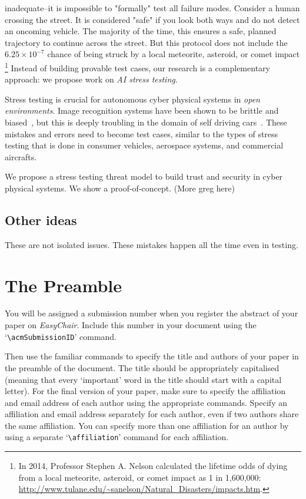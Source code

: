 \documentclass[sigconf,anonymous]{aamas}
\begin{document}
inadequate--it is impossible to "formally" test all failure modes.
Consider a human crossing the street.  It is considered "safe" if you
look both ways and do not detect an oncoming vehicle.  The majority of
the time, this ensures a safe, planned trajectory to continue across
the street.  But this protocol does not include the \(6.25 \times
10^{-7}\) chance of being struck by a local meteorite, asteroid, or
comet impact \footnote{In 2014, Professor Stephen A. Nelson calculated the lifetime
odds of dying from a local meteorite, asteroid, or comet impact as 1
in 1,600,000:
\url{http://www.tulane.edu/\~sanelson/Natural\_Disasters/impacts.htm}.} Instead of building provable test cases, our
research is a complementary approach: we propose work on \emph{AI stress
testing}.

Stress testing is crucial for autonomous cyber physical systems in
\emph{open environments}.  Image recognition systems have been shown to be
brittle and biased~\cite{fooled}, but this is deeply troubling in the
domain of self driving cars~\cite{physical-attacks}.  These mistakes and errors
need to become test cases, similar to the types of stress testing that
is done in consumer vehicles, aerospace systems, and commercial
aircrafts.  

We propose a stress testing threat model to build trust and security
in cyber physical systems.  We show a proof-of-concept. (More greg here)

\subsection{Other ideas}
\label{sec:org4ff9cc9}
These are not isolated issues.  These mistakes happen all the time
even in testing.


\section{The Preamble}

You will be assigned a submission number when you register the abstract 
of your paper on \textit{EasyChair}. Include this number in your 
document using the `\verb|\acmSubmissionID|' command.

Then use the familiar commands to specify the title and authors of your
paper in the preamble of the document. The title should be appropriately 
capitalised (meaning that every `important' word in the title should 
start with a capital letter). For the final version of your paper, make 
sure to specify the affiliation and email address of each author using 
the appropriate commands. Specify an affiliation and email address 
separately for each author, even if two authors share the same 
affiliation. You can specify more than one affiliation for an author by 
using a separate `\verb|\affiliation|' command for each affiliation.
\end{document}
